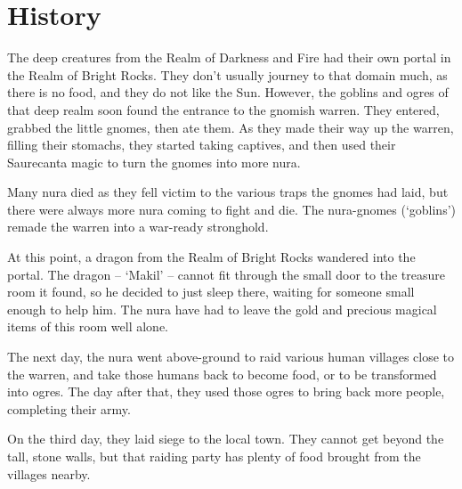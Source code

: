 \section{History}
\label{invasionhistory}

\begin{multicols}{2}


The deep creatures from the Realm of Darkness and Fire had their own portal in the Realm of Bright Rocks.
They don't usually journey to that domain much, as there is no food, and they do not like the Sun.
However, the goblins and ogres of that deep realm soon found the entrance to the gnomish warren.
They entered, grabbed the little gnomes, then ate them.
As they made their way up the warren, filling their stomachs, they started taking captives, and then used their Saurecanta magic to turn the gnomes into more nura.

Many nura died as they fell victim to the various traps the gnomes had laid, but there were always more nura coming to fight and die.
The nura-gnomes (`goblins') remade the warren into a war-ready stronghold.

At this point, a dragon from the Realm of Bright Rocks wandered into the portal.
The dragon -- `Makil' -- cannot fit through the small door to the treasure room it found, so he decided to just sleep there, waiting for someone small enough to help him.
The nura have had to leave the gold and precious magical items of this room well alone.

The next day, the nura went above-ground to raid various human villages close to the warren, and take those humans back to become food, or to be transformed into ogres.
The day after that, they used those ogres to bring back more people, completing their army.

On the third day, they laid siege to the local town.
They cannot get beyond the tall, stone walls, but that raiding party has plenty of food brought from the villages nearby.

\end{multicols}


